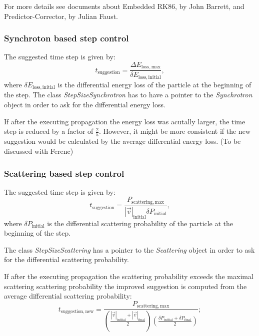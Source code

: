         For more details see documents about Embedded RK86, by John Barrett, and Predictor-Corrector, by Julian Faust.
        
    \subsubsection*{Synchroton based step control}
    The suggested time step is given by:
        \begin{equation}
            t_{\mathrm{suggestion}} = \frac{\Delta E_{\mathrm{loss,max}}}{\delta E_{\mathrm{loss,initial}}},
        \end{equation}
    where $\delta E_{\mathrm{loss,initial}}$ is the differential energy loss of the particle at the beginning of the step. The class \textit{StepSizeSynchrotron} has to have a pointer to the \textit{Synchrotron} object in order to ask for the differential energy loss.
    
    If after the executing propagation the energy loss was acutally larger, the time step is reduced by a factor of $\frac{2}{5}$.
    However, it might be more consistent if the new suggestion would be calculated by the average differential energy loss. (To be discussed with Ferenc)
    
    \subsubsection*{Scattering based step control}
    The suggested time step is given by:
        \begin{equation}
            t_{\mathrm{suggestion}} = \frac{P_{\mathrm{scattering,max}}}{| \vec{v} |_{\mathrm{initial}} \delta P_{\mathrm{initial}}},
        \end{equation}
    where $\delta P_{\mathrm{initial}}$ is the differential scattering probability of the particle at the beginning of the step.
    
    The class \textit{StepSizeScattering} has a pointer to the \textit{Scattering} object in order to ask for the differential scattering probability.
    
    If after the executing propagation the scattering probability exceeds the maximal scattering scattering probability the improved suggestion is computed from the average differential scattering probability:
        \begin{equation}
            t_{\mathrm{suggestion,new}} = \frac{P_{\mathrm{scattering,max}}}{ \left( \frac{|\vec{v}|_{\mathrm{initial}} + |\vec{v}|_{\mathrm{final}}}{2}\right) \left ( \frac{\delta P_{\mathrm{initial}} + \delta P_{\mathrm{final}} }{2}\right)};
        \end{equation}
           
